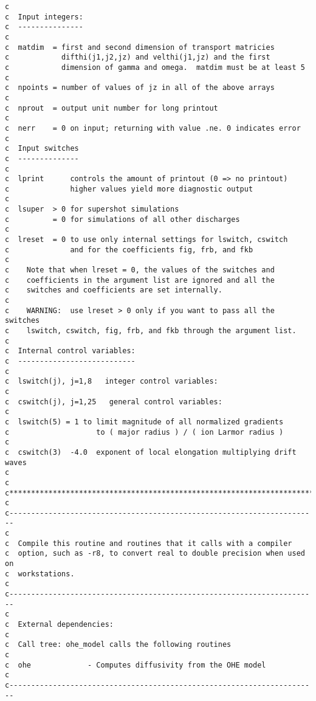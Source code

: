 \begin{verbatim}
c
c  Input integers:
c  ---------------
c
c  matdim  = first and second dimension of transport matricies
c            difthi(j1,j2,jz) and velthi(j1,jz) and the first 
c            dimension of gamma and omega.  matdim must be at least 5
c
c  npoints = number of values of jz in all of the above arrays
c
c  nprout  = output unit number for long printout
c
c  nerr    = 0 on input; returning with value .ne. 0 indicates error
c
c  Input switches
c  --------------
c
c  lprint      controls the amount of printout (0 => no printout)
c              higher values yield more diagnostic output
c
c  lsuper  > 0 for supershot simulations
c          = 0 for simulations of all other discharges
c
c  lreset  = 0 to use only internal settings for lswitch, cswitch
c              and for the coefficients fig, frb, and fkb
c
c    Note that when lreset = 0, the values of the switches and
c    coefficients in the argument list are ignored and all the 
c    switches and coefficients are set internally.
c
c    WARNING:  use lreset > 0 only if you want to pass all the switches
c    lswitch, cswitch, fig, frb, and fkb through the argument list.
c
c  Internal control variables:
c  ---------------------------
c
c  lswitch(j), j=1,8   integer control variables: 
c
c  cswitch(j), j=1,25   general control variables:
c
c  lswitch(5) = 1 to limit magnitude of all normalized gradients
c                    to ( major radius ) / ( ion Larmor radius )
c
c  cswitch(3)  -4.0  exponent of local elongation multiplying drift waves
c
c
c***********************************************************************
c
c-----------------------------------------------------------------------
c
c  Compile this routine and routines that it calls with a compiler 
c  option, such as -r8, to convert real to double precision when used on 
c  workstations.
c
c-----------------------------------------------------------------------
c
c  External dependencies:
c
c  Call tree: ohe_model calls the following routines
c
c  ohe             - Computes diffusivity from the OHE model
c
c-----------------------------------------------------------------------


\end{verbatim}
